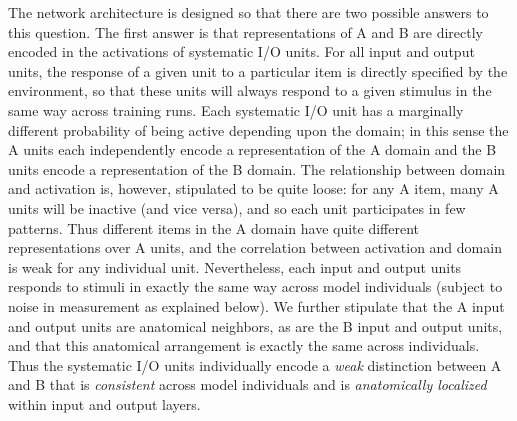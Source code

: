 The network architecture is designed so that there are two possible answers to this question. The first answer is that representations of A and B are directly encoded in the activations of systematic I/O units. For all input and output units, the response of a given unit to a particular item is directly specified by the environment, so that these units will always respond to a given stimulus in the same way across training runs. Each systematic I/O unit has a marginally different probability of being active depending upon the domain; in this sense the A units each independently encode a representation of the A domain and the B units encode a representation of the B domain. The relationship between domain and activation is, however, stipulated to be quite loose: for any A item, many A units will be inactive (and vice versa), and so each unit participates in few patterns. Thus different items in the A domain have quite different representations over A units, and the correlation between activation and domain is weak for any individual unit. Nevertheless, each input and output units responds to stimuli in exactly the same way across model individuals (subject to noise in measurement as explained below). We further stipulate that the A input and output units are anatomical neighbors, as are the B input and output units, and that this anatomical arrangement is exactly the same across individuals. Thus the systematic I/O units individually encode a {\em weak} distinction between A and B that is {\em consistent} across model individuals and is {\em anatomically localized} within input and output layers. 

